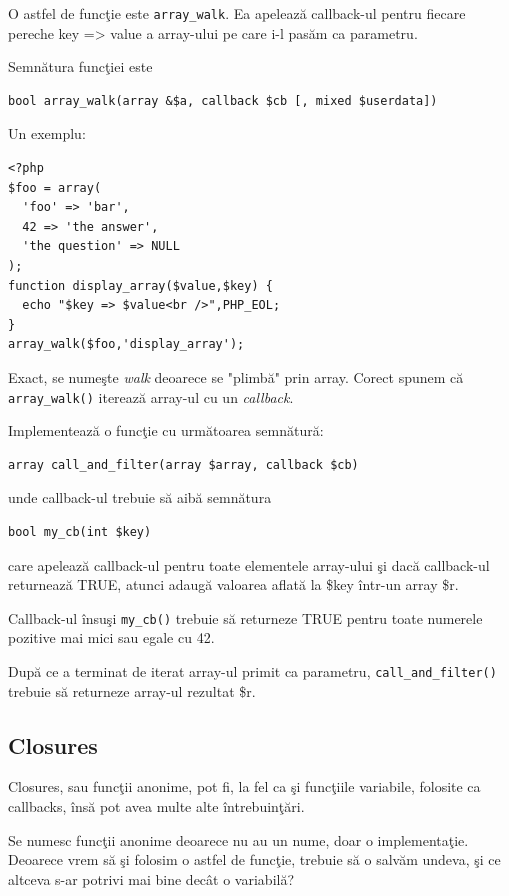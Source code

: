 O astfel de funcţie este \texttt{array\_walk}. Ea apelează callback-ul
pentru fiecare pereche key => value a array-ului pe care i-l pasăm ca parametru.

Semnătura funcţiei este
\begin{verbatim}
bool array_walk(array &$a, callback $cb [, mixed $userdata])
\end{verbatim}
Un exemplu:
\begin{lstlisting}
<?php
$foo = array(
  'foo' => 'bar',
  42 => 'the answer',
  'the question' => NULL
);
function display_array($value,$key) {
  echo "$key => $value<br />",PHP_EOL;
}
array_walk($foo,'display_array');
\end{lstlisting}
Exact, se numeşte \textit{walk} deoarece se "plimbă" prin array.
Corect spunem că \texttt{array\_walk()} iterează array-ul
cu un \textit{callback}.

\begin{Exercise}[title={Callbacks}]
Implementează o funcţie cu următoarea semnătură:
\begin{verbatim}
array call_and_filter(array $array, callback $cb)
\end{verbatim}
unde callback-ul trebuie să aibă semnătura
\begin{verbatim}
bool my_cb(int $key)
\end{verbatim}
care apelează callback-ul pentru toate elementele array-ului şi dacă
callback-ul returnează TRUE, atunci adaugă valoarea aflată la \$key
într-un array \$r.

Callback-ul însuşi \texttt{my\_cb()} trebuie să returneze TRUE pentru
toate numerele pozitive mai mici sau egale cu 42.

După ce a terminat de iterat array-ul primit ca
parametru, \texttt{call\_and\_filter()} trebuie să returneze array-ul
rezultat \$r.
\end{Exercise}


\subsection{Closures}
Closures, sau funcţii anonime, pot fi, la fel ca şi funcţiile variabile,
folosite ca callbacks, însă pot avea multe alte întrebuinţări.

Se numesc funcţii anonime deoarece nu au un nume, doar o implementaţie.
Deoarece vrem să şi folosim o astfel de funcţie, trebuie să o salvăm
undeva, şi ce altceva s-ar potrivi mai bine decât o variabilă?

